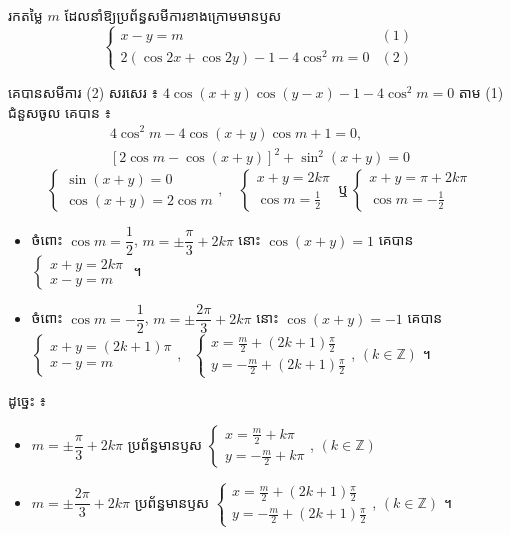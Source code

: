 \begin{example}[លំហាត់គំរូ ៥]
រកតម្លៃ $m$ ដែលនាំឱ្យប្រព័ន្ធសមីការខាងក្រោមមានឫស
\[ \begin{cases} x - y = m & (1)\\ 2(\cos 2x + \cos 2y) - 1 - 4\cos^2 m = 0 & (2) \end{cases} \]
\end{example}
\ans
គេបានសមីការ (2) សរសេរ ៖ $4\cos(x + y)\cos(y - x) - 1 - 4\cos^2 m = 0$ តាម (1) ជំនួសចូល គេបាន ៖
\[
\begin{gathered}
4\cos^2 m - 4\cos(x + y)\cos m + 1 = 0,\\
[2\cos m - \cos(x + y)]^2 + \sin^2(x + y) = 0
\end{gathered}
\]
\[ \begin{cases} \sin(x + y) = 0\\ \cos(x + y) = 2\cos m \end{cases}, \quad \begin{cases} x + y = 2k\pi\\ \cos m = \frac{1}{2} \end{cases} \ \text{ឬ} \ \begin{cases} x + y = \pi + 2k\pi\\ \cos m = -\frac{1}{2} \end{cases} \]
\begin{itemize}
  \item ចំពោះ $\cos m = \dfrac{1}{2}$, $m = \pm\dfrac{\pi}{3} + 2k\pi$ នោះ $\cos(x + y) = 1$ គេបាន $\begin{cases} x + y = 2k\pi\\ x - y = m \end{cases}$ ។
  \item ចំពោះ $\cos m = -\dfrac{1}{2}$, $m = \pm\dfrac{2\pi}{3} + 2k\pi$ នោះ $\cos(x + y) = -1$ គេបាន $\begin{cases} x + y = (2k + 1)\pi\\ x - y = m \end{cases}$, \ $\begin{cases} x = \frac{m}{2} + (2k + 1)\frac{\pi}{2}\\ y = -\frac{m}{2} + (2k + 1)\frac{\pi}{2} \end{cases}$, $(k \in \mathbb{Z})$ ។
\end{itemize}
ដូច្នេះ ៖
\begin{itemize}
  \item $m = \pm\dfrac{\pi}{3} + 2k\pi$ ប្រព័ន្ធមានឫស $\begin{cases} x = \frac{m}{2} + k\pi\\ y = -\frac{m}{2} + k\pi \end{cases}$, $(k \in \mathbb{Z})$
  \item $m = \pm\dfrac{2\pi}{3} + 2k\pi$ ប្រព័ន្ធមានឫស $\begin{cases} x = \frac{m}{2} + (2k + 1)\frac{\pi}{2}\\ y = -\frac{m}{2} + (2k + 1)\frac{\pi}{2} \end{cases}$, $(k \in \mathbb{Z})$ ។
\end{itemize}


